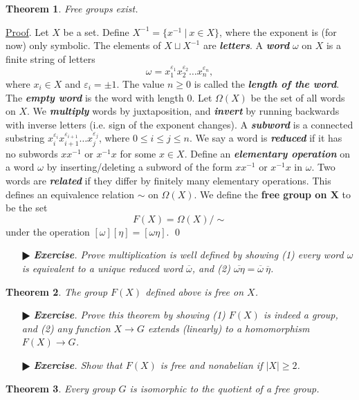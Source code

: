 \documentclass[11pt]{amsart}
\newtheorem*{theorem*}{Theorem}
\theoremstyle{definition}
\renewenvironment{proof}{\underline{Proof}.}{\qed}
\renewcommand\geq{\geqslant}
\renewcommand\leq{\leqslant}
\renewcommand\:{\colon}
\newcommand{\1}{\mathds{1}}
\newcommand{\exc}[1]{\vspace{-2.5pt}\begin{itemize}[leftmargin=15pt]\item[$\RHD$] \textit{\textbf{Exercise}. #1}\end{itemize}}
\begin{document}
\begin{theorem*}
	Free groups exist.
\end{theorem*}
\begin{proof}
	Let $X$ be a set. Define $X^{-1} = \{x^{-1} \ | \ x \in X\}$, where the exponent is (for now) only symbolic. The elements of $X \sqcup X^{-1}$ are \textbf{\textit{letters}}. A \textbf{\textit{word}} $\omega$ on $X$ is a finite string of letters
		\[ \omega = x_1^{\varepsilon_1}x_2^{\varepsilon_2} \dots x_n^{\varepsilon_n}, \]
	where $x_i \in X$ and $\varepsilon_i = \pm 1$. The value $n \geq 0$ is called the \textbf{\textit{length of the word}}. The \textbf{\textit{empty word}} is the word with length 0. Let $\Omega(X)$ be the set of all words on $X$. We \textbf{\textit{multiply}} words by juxtaposition, and \textbf{\textit{invert}} by running backwards with inverse letters (i.e. sign of the exponent changes). A \textbf{\textit{subword}} is a connected substring $x_i^{\varepsilon_i}x_{i+1}^{\varepsilon_{i+1}}\dots x_j^{\varepsilon_j}$, where $0 \leq i \leq j \leq n$. We say a word is \textbf{\textit{reduced}} if it has no subwords $xx^{-1}$ or $x^{-1}x$ for some $x \in X$. Define an \textbf{\textit{elementary operation}} on a word $\omega$ by inserting/deleting a subword of the form $xx^{-1}$ or $x^{-1}x$ in $\omega$. Two words are \textbf{\textit{related}} if they differ by finitely many elementary operations. This defines an equivalence relation $\sim$ on $\Omega(X)$. We define the \textbf{free group on $\boldsymbol{X}$} to be the set
		\[ F(X) = \Omega(X)/\sim \] 
	under the operation $[\omega][\eta] = [\omega\eta]$.
\end{proof}

\exc{Prove multiplication is well defined by showing \textnormal{(1)} every word $\omega$ is equivalent to a unique reduced word $\overline{\omega}$, and \textnormal{(2)} $\overline{\omega\eta} = \overline{\omega} \ \overline{\eta}$.}

\begin{theorem*}
	The group $F(X)$ defined above is free on $X$.
\end{theorem*}

\exc{Prove this theorem by showing \textnormal{(1)} $F(X)$ is indeed a group, and \textnormal{(2)} any function $X \to G$ extends \textnormal{(}linearly\textnormal{)} to a homomorphism $F(X) \to G$.}
\exc{Show that $F(X)$ is free and nonabelian if $|X| \geq 2$.}

\begin{theorem*}
	Every group $G$ is isomorphic to the quotient of a free group.
\end{theorem*}
\end{document}

